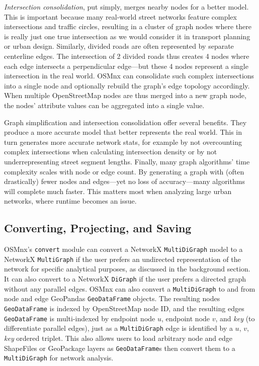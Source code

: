 \documentclass[12pt,letterpaper]{article} %
\begin{document}
\textit{Intersection consolidation}, put simply, merges nearby nodes for a better model. This is important because many real-world street networks feature complex intersections and traffic circles, resulting in a cluster of graph nodes where there is really just one true intersection as we would consider it in transport planning or urban design. Similarly, divided roads are often represented by separate centerline edges. The intersection of 2 divided roads thus creates 4 nodes where each edge intersects a perpendicular edge---but these 4 nodes represent a single intersection in the real world. OSMnx can consolidate such complex intersections into a single node and optionally rebuild the graph's edge topology accordingly. When multiple OpenStreetMap nodes are thus merged into a new graph node, the nodes' attribute values can be aggregated into a single value.

Graph simplification and intersection consolidation offer several benefits. They produce a more accurate model that better represents the real world. This in turn generates more accurate network stats, for example by not overcounting complex intersections when calculating intersection density or by not underrepresenting street segment lengths. Finally, many graph algorithms' time complexity scales with node or edge count. By generating a graph with (often drastically) fewer nodes and edges---yet no loss of accuracy---many algorithms will complete much faster. This matters most when analyzing large urban networks, where runtime becomes an issue.

\subsection{Converting, Projecting, and Saving}

OSMnx's \texttt{convert} module can convert a NetworkX \texttt{MultiDiGraph} model to a NetworkX \texttt{MultiGraph} if the user prefers an undirected representation of the network for specific analytical purposes, as discussed in the background section. It can also convert to a NetworkX \texttt{DiGraph} if the user prefers a directed graph without any parallel edges. OSMnx can also convert a \texttt{MultiDiGraph} to and from node and edge GeoPandas \texttt{GeoDataFrame} objects. The resulting nodes \texttt{GeoDataFrame} is indexed by OpenStreetMap node ID, and the resulting edges \texttt{GeoDataFrame} is multi-indexed by endpoint node $u$, endpoint node $v$, and \textit{key} (to differentiate parallel edges), just as a \texttt{MultiDiGraph} edge is identified by a $u$, $v$, \textit{key} ordered triplet. This also allows users to load arbitrary node and edge ShapeFiles or GeoPackage layers as \texttt{GeoDataFrame}s then convert them to a \texttt{MultiDiGraph} for network analysis.
\end{document}
